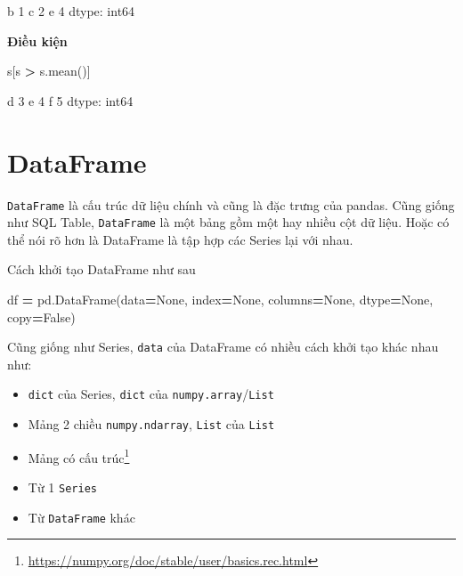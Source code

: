 \documentclass[
]{book}
\newenvironment{Shaded}{\begin{snugshade}}{\end{snugshade}}
\newcommand{\NormalTok}[1]{#1}
\newcommand{\OperatorTok}[1]{\textcolor[rgb]{0.81,0.36,0.00}{\textbf{#1}}}
\newcommand{\VariableTok}[1]{\textcolor[rgb]{0.00,0.00,0.00}{#1}}
\providecommand{\tightlist}{%
  \setlength{\itemsep}{0pt}\setlength{\parskip}{0pt}}
\renewcommand{\href}[2]{#2\footnote{\url{#1}}}
\begin{document}
\begin{Shaded}
\begin{Highlighting}[]
\NormalTok{b    1}
\NormalTok{c    2}
\NormalTok{e    4}
\NormalTok{dtype: int64}
\end{Highlighting}
\end{Shaded}

\textbf{Điều kiện}

\begin{Shaded}
\begin{Highlighting}[]
\NormalTok{s[s }\OperatorTok{\textgreater{}}\NormalTok{ s.mean()]}
\end{Highlighting}
\end{Shaded}

\begin{Shaded}
\begin{Highlighting}[]
\NormalTok{d    3}
\NormalTok{e    4}
\NormalTok{f    5}
\NormalTok{dtype: int64}
\end{Highlighting}
\end{Shaded}

\section{DataFrame}\label{cach-khoi-tao-data-frame}

\texttt{DataFrame} là cấu trúc dữ liệu chính và cũng là đặc trưng của pandas. Cũng giống như SQL Table,
\texttt{DataFrame} là một bảng gồm một hay nhiều cột dữ liệu. Hoặc có thể nói rõ hơn là DataFrame là tập
hợp các Series lại với nhau.

Cách khởi tạo DataFrame như sau

\begin{Shaded}
\begin{Highlighting}[]
\NormalTok{df }\OperatorTok{=}\NormalTok{ pd.DataFrame(data}\OperatorTok{=}\VariableTok{None}\NormalTok{, index}\OperatorTok{=}\VariableTok{None}\NormalTok{, columns}\OperatorTok{=}\VariableTok{None}\NormalTok{, dtype}\OperatorTok{=}\VariableTok{None}\NormalTok{, copy}\OperatorTok{=}\VariableTok{False}\NormalTok{)}
\end{Highlighting}
\end{Shaded}

Cũng giống như Series, \texttt{data} của DataFrame có nhiều cách khởi tạo khác nhau như:

\begin{itemize}
\tightlist
\item
  \texttt{dict} của Series, \texttt{dict} của \texttt{numpy.array}/\texttt{List}
\item
  Mảng 2 chiều \texttt{numpy.ndarray}, \texttt{List} của \texttt{List}
\item
  \href{https://numpy.org/doc/stable/user/basics.rec.html}{Mảng có cấu trúc}
\item
  Từ 1 \texttt{Series}
\item
  Từ \texttt{DataFrame} khác
\end{itemize}
\end{document}
